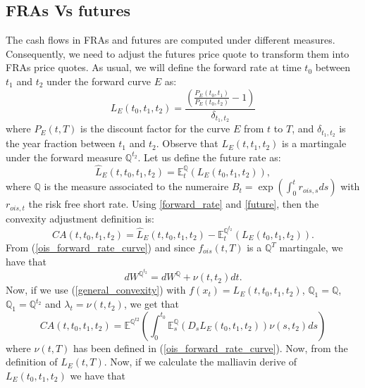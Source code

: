 \documentclass[a4paper,10pt]{article}
\newcommand{\1}{\mathbf{1}}
\begin{document}
\subsection{FRAs Vs futures}
 The cash flows in FRAs and futures are computed under different measures. Consequently, we need to adjust the futures price quote to transform them into FRAs price quotes. As usual, we will define the forward rate at time $t_0$ between $t_1$ and $t_2$ under the forward curve $E$ as:
\begin{equation}\label{forward_rate}
L_{E}(t_0, t_1, t_2) = \frac{\left(\frac{P_{E}(t_0,t_1)}{P_{E}(t_0,t_2)} - 1 \right)}{\delta_{t_1,t_2}}
\end{equation} 
where $P_{E}(t,T)$ is the discount factor for the curve $E$ from $t$ to $T$, and $\delta_{t_1,t_2}$ is the year fraction between $t_1$ and $t_2$. Observe that $L_{E}(t, t_1, t_2)$ is a martingale under the forward measure $\mathbb{Q}^{t_2}$. Let us define the future rate as:    
\begin{equation}\label{future}
\hat{L}_{E}(t,t_0, t_1, t_2) = \mathbb{E}_t^{\mathbb{Q}}\left(L_{E}(t_0, t_1, t_2) \right), 
\end{equation}
where $\mathbb{Q}$ is the measure associated to the numeraire $B_t=\exp\left(\int_{0}^{t} r_{ois, s} ds \right)$ with $ r_{ois, t}$ the risk free short rate. Using
\eqref{forward_rate} and \eqref{future}, then the convexity adjustment definition is:
\begin{equation*}
CA(t, t_0, t_1, t_2) = \hat{L}_{E}(t,t_0, t_1, t_2) - \mathbb{E}_t^{\mathbb{Q}^{t_2}}\left(L_{E}(t_0, t_1, t_2) \right).
\end{equation*}
From (\ref{ois_forward_rate_curve}) and since $f_{ois}(t,T)$ is a $\mathbb{Q}^{T}$ martingale, we have that
\begin{equation}\label{girsanov_spot_forward}
dW^{\mathbb{Q}^{t_2}} = dW^{\mathbb{Q}} + \nu(t,t_2) dt. 
\end{equation}
Now, if we use (\ref{general_convexity}) with $f(x_t)=L_{E}(t,t_0, t_1, t_2)$, $\mathbb{Q}_1=\mathbb{Q}$, $\mathbb{Q}_1=\mathbb{Q}^{t_2}$ and $\lambda_t = \nu(t,t_2)$,  we get that
\begin{equation}\label{ca_general_future}
CA(t, t_0, t_1, t_2) = \mathbb{E}^{\mathbb{Q}^{t2}}\left(\int_{0}^{t_0} \mathbb{E}^{\mathbb{Q}}_{s}\left(D_s L_{E}(t_0,t_1,t_2) \right) \nu(s,t_2) ds \right)
\end{equation}
where $\nu(t,T)$ has been defined in (\ref{ois_forward_rate_curve}). Now, from the definition of $L_{E}(t,T)$. Now, if we calculate the malliavin derive of $L_{E}(t_0,t_1,t_2)$ we have that
\end{document}
